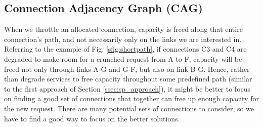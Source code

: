 \documentclass[journal]{IEEEtran}
\newtheorem{theorem}{Theorem}[]
\begin{document}


\subsection{Connection Adjacency Graph (CAG)}\label{sec:cag}

When we throttle an allocated connection, capacity is freed along that entire connection's path, and not necessarily only on the links we are interested in. Referring to the example of Fig. \ref{sfig:shortpath}, if connections C3 and C4 are degraded to make room for a crunched request from A to F, capacity will be freed not only through links A-G and G-F, but also on link B-G. Hence, rather than degrade services to free capacity throughout some predefined path (similar to the first approach of Section \ref{ssec:sp_approach}), it might be better to focus on finding a good set of connections that together can free up enough capacity for the new request. There are many potential sets of connections to consider, so we have to find a good way to focus on the better solutions.
\end{document}
